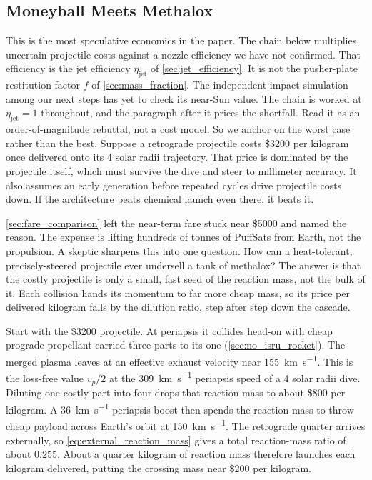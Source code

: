 \documentclass{article}
\begin{document}
\subsection{Moneyball Meets Methalox}\label{sec:methalox_rebuttal}\cite{moneyball_film}
This is the most speculative economics in the paper. The chain below multiplies uncertain projectile costs against a nozzle efficiency we have not confirmed. That efficiency is the jet efficiency $\eta_{\mathrm{jet}}$ of \autoref{sec:jet_efficiency}. It is not the pusher-plate restitution factor $f$ of \autoref{sec:mass_fraction}. The independent impact simulation among our next steps has yet to check its near-Sun value. The chain is worked at $\eta_{\mathrm{jet}} = 1$ throughout, and the paragraph after it prices the shortfall. Read it as an order-of-magnitude rebuttal, not a cost model. So we anchor on the worst case rather than the best. Suppose a retrograde projectile costs \$3200 per kilogram once delivered onto its 4 solar radii trajectory. That price is dominated by the projectile itself, which must survive the dive and steer to millimeter accuracy. It also assumes an early generation before repeated cycles drive projectile costs down. If the architecture beats chemical launch even there, it beats it.

\autoref{sec:fare_comparison} left the near-term fare stuck near \$5000 and named the reason. The expense is lifting hundreds of tonnes of PuffSats from Earth, not the propulsion. A skeptic sharpens this into one question. How can a heat-tolerant, precisely-steered projectile ever undersell a tank of methalox? The answer is that the costly projectile is only a small, fast seed of the reaction mass, not the bulk of it. Each collision hands its momentum to far more cheap mass, so its price per delivered kilogram falls by the dilution ratio, step after step down the cascade.

Start with the \$3200 projectile. At periapsis it collides head-on with cheap prograde propellant carried three parts to its one (\autoref{sec:no_isru_rocket}). The merged plasma leaves at an effective exhaust velocity near \SI{155}{\kilo\meter\per\second}. This is the loss-free value $v_p/2$ at the \SI{309}{\kilo\meter\per\second} periapsis speed of a 4 solar radii dive. Diluting one costly part into four drops that reaction mass to about \$800 per kilogram. A \SI{36}{\kilo\meter\per\second} periapsis boost then spends the reaction mass to throw cheap payload across Earth's orbit at \SI{150}{\kilo\meter\per\second}. The retrograde quarter arrives externally, so \autoref{eq:external_reaction_mass} gives a total reaction-mass ratio of about $0.255$. About a quarter kilogram of reaction mass therefore launches each kilogram delivered, putting the crossing mass near \$200 per kilogram.
\end{document}
